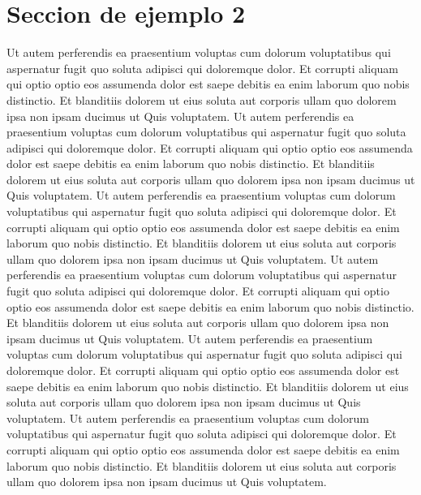 \section{Seccion de ejemplo 2}
    Ut autem perferendis ea praesentium voluptas cum dolorum voluptatibus qui aspernatur fugit quo soluta adipisci qui doloremque dolor. Et corrupti aliquam qui optio optio eos assumenda dolor est saepe debitis ea enim laborum quo nobis distinctio. Et blanditiis dolorem ut eius soluta aut corporis ullam quo dolorem ipsa non ipsam ducimus ut Quis voluptatem.
    \newline 
    Ut autem perferendis ea praesentium voluptas cum dolorum voluptatibus qui aspernatur fugit quo soluta adipisci qui doloremque dolor. Et corrupti aliquam qui optio optio eos assumenda dolor est saepe debitis ea enim laborum quo nobis distinctio. Et blanditiis dolorem ut eius soluta aut corporis ullam quo dolorem ipsa non ipsam ducimus ut Quis voluptatem.
    \newline 
    Ut autem perferendis ea praesentium voluptas cum dolorum voluptatibus qui aspernatur fugit quo soluta adipisci qui doloremque dolor. Et corrupti aliquam qui optio optio eos assumenda dolor est saepe debitis ea enim laborum quo nobis distinctio. Et blanditiis dolorem ut eius soluta aut corporis ullam quo dolorem ipsa non ipsam ducimus ut Quis voluptatem.
    \newline 
    Ut autem perferendis ea praesentium voluptas cum dolorum voluptatibus qui aspernatur fugit quo soluta adipisci qui doloremque dolor. Et corrupti aliquam qui optio optio eos assumenda dolor est saepe debitis ea enim laborum quo nobis distinctio. Et blanditiis dolorem ut eius soluta aut corporis ullam quo dolorem ipsa non ipsam ducimus ut Quis voluptatem.
    \newline 
    Ut autem perferendis ea praesentium voluptas cum dolorum voluptatibus qui aspernatur fugit quo soluta adipisci qui doloremque dolor. Et corrupti aliquam qui optio optio eos assumenda dolor est saepe debitis ea enim laborum quo nobis distinctio. Et blanditiis dolorem ut eius soluta aut corporis ullam quo dolorem ipsa non ipsam ducimus ut Quis voluptatem.
    \newline 
    Ut autem perferendis ea praesentium voluptas cum dolorum voluptatibus qui aspernatur fugit quo soluta adipisci qui doloremque dolor. Et corrupti aliquam qui optio optio eos assumenda dolor est saepe debitis ea enim laborum quo nobis distinctio. Et blanditiis dolorem ut eius soluta aut corporis ullam quo dolorem ipsa non ipsam ducimus ut Quis voluptatem.


